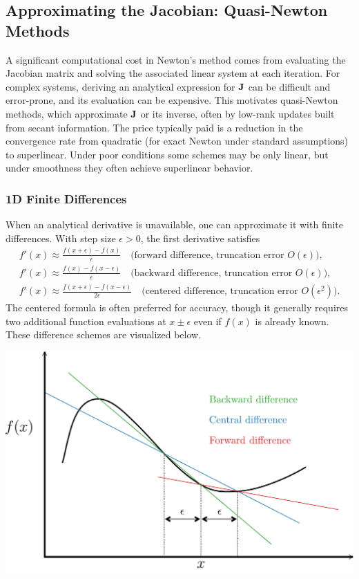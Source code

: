 \subsection{Approximating the Jacobian: Quasi-Newton Methods}
A significant computational cost in Newton's method comes from evaluating the Jacobian matrix and solving the associated linear system at each iteration. For complex systems, deriving an analytical expression for \(\mathbf{J}\) can be difficult and error-prone, and its evaluation can be expensive. This motivates quasi-Newton methods, which approximate \(\mathbf{J}\) or its inverse, often by low-rank updates built from secant information. The price typically paid is a reduction in the convergence rate from quadratic (for exact Newton under standard assumptions) to superlinear. Under poor conditions some schemes may be only linear, but under smoothness they often achieve superlinear behavior.

\subsubsection{1D Finite Differences} 
When an analytical derivative is unavailable, one can approximate it with finite differences. With step size \(\epsilon>0\), the first derivative satisfies
\begin{gather*}
  f'(x) \approx \frac{f(x+\epsilon)-f(x)}{\epsilon}
  \quad\text{(forward difference, truncation error }O(\epsilon)\text{),} \\
  f'(x) \approx \frac{f(x)-f(x-\epsilon)}{\epsilon}
  \quad\text{(backward difference, truncation error }O(\epsilon)\text{),} \\
  f'(x) \approx \frac{f(x+\epsilon)-f(x-\epsilon)}{2\epsilon}
  \quad\text{(centered difference, truncation error }O(\epsilon^2)\text{).}
\end{gather*}
The centered formula is often preferred for accuracy, though it generally requires two additional function evaluations at \(x\pm\epsilon\) even if \(f(x)\) is already known. These difference schemes are visualized below. 

\begin{center}
    \includegraphics[width=.5\textwidth]{figs/nle/difference_schemes.pdf}
\end{center}

